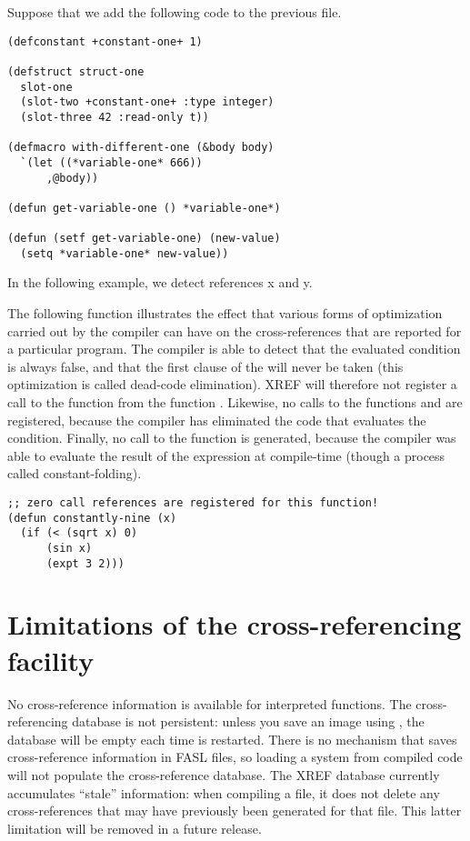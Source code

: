 Suppose that we add the following code to the previous file. 

\begin{verbatim}
(defconstant +constant-one+ 1)
  
(defstruct struct-one
  slot-one
  (slot-two +constant-one+ :type integer)
  (slot-three 42 :read-only t))

(defmacro with-different-one (&body body)
  `(let ((*variable-one* 666))
      ,@body))

(defun get-variable-one () *variable-one*)

(defun (setf get-variable-one) (new-value)
  (setq *variable-one* new-value))
\end{verbatim}

In the following example, we detect references x and y.





The following function illustrates the effect that various forms of
optimization carried out by the \cmucl{} compiler can have on the
cross-references that are reported for a particular program. The
compiler is able to detect that the evaluated condition is always
false, and that the first clause of the  will never be taken
(this optimization is called dead-code elimination). XREF will
therefore not register a call to the function  from the
function . Likewise, no calls to the functions 
and \code{\textless} are registered, because the compiler has eliminated the
code that evaluates the condition. Finally, no call to the function
 is generated, because the compiler was able to evaluate
the result of the expression  at compile-time (though
a process called constant-folding).

\begin{verbatim}
;; zero call references are registered for this function!
(defun constantly-nine (x)
  (if (< (sqrt x) 0)
      (sin x)
      (expt 3 2)))
\end{verbatim}


\section{Limitations of the cross-referencing facility}

No cross-reference information is available for interpreted functions.
The cross-referencing database is not persistent: unless you save an
image using , the database will be empty each time
\cmucl{} is restarted. There is no mechanism that saves
cross-reference information in FASL files, so loading a system from
compiled code will not populate the cross-reference database. The XREF
database currently accumulates ``stale'' information: when compiling a
file, it does not delete any cross-references that may have previously
been generated for that file. This latter limitation will be removed
in a future release. 

